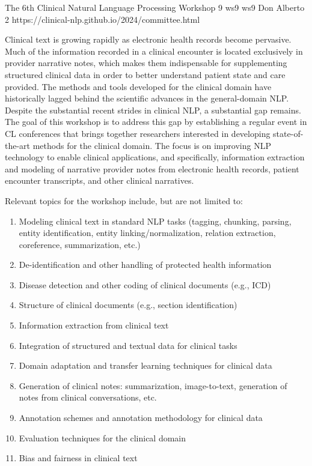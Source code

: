 \begin{wsschedulenolist}
{The 6th Clinical Natural Language Processing Workshop}
{9}
{ws9}
{ws9}
{Don Alberto 2}
{https://clinical-nlp.github.io/2024/committee.html}

Clinical text is growing rapidly as electronic health records become pervasive. Much of the information recorded in a clinical encounter is located exclusively in provider narrative notes, which makes them indispensable for supplementing structured clinical data in order to better understand patient state and care provided. The methods and tools developed for the clinical domain have historically lagged behind the scientific advances in the general-domain NLP. Despite the substantial recent strides in clinical NLP, a substantial gap remains. The goal of this workshop is to address this gap by establishing a regular event in CL conferences that brings together researchers interested in developing state-of-the-art methods for the clinical domain. The focus is on improving NLP technology to enable clinical applications, and specifically, information extraction and modeling of narrative provider notes from electronic health records, patient encounter transcripts, and other clinical narratives.

Relevant topics for the workshop include, but are not limited to:

\begin{enumerate}
\item Modeling clinical text in standard NLP tasks (tagging, chunking, parsing, entity identification, entity linking/normalization, relation extraction, coreference, summarization, etc.)
\item De-identification and other handling of protected health information
\item Disease detection and other coding of clinical documents (e.g., ICD)
\item Structure of clinical documents (e.g., section identification)
\item Information extraction from clinical text
\item Integration of structured and textual data for clinical tasks
\item Domain adaptation and transfer learning techniques for clinical data
\item Generation of clinical notes: summarization, image-to-text, generation of notes from clinical conversations, etc.
\item Annotation schemes and annotation methodology for clinical data
\item Evaluation techniques for the clinical domain
\item Bias and fairness in clinical text
\end{enumerate}


\end{wsschedulenolist}
